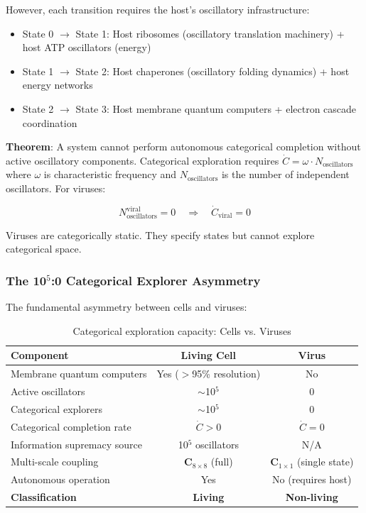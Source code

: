 \documentclass[11pt]{article}
\begin{document}
However, each transition requires the host's oscillatory infrastructure:

\begin{itemize}
\item State 0 $\to$ State 1: Host ribosomes (oscillatory translation machinery) + host ATP oscillators (energy)
\item State 1 $\to$ State 2: Host chaperones (oscillatory folding dynamics) + host energy networks
\item State 2 $\to$ State 3: Host membrane quantum computers + electron cascade coordination
\end{itemize}

\textbf{Theorem}: A system cannot perform autonomous categorical completion without active oscillatory components. Categorical exploration requires $\dot{C} = \omega \cdot N_{\text{oscillators}}$ where $\omega$ is characteristic frequency and $N_{\text{oscillators}}$ is the number of independent oscillators. For viruses:

\begin{equation}
N_{\text{oscillators}}^{\text{viral}} = 0 \quad \Rightarrow \quad \dot{C}_{\text{viral}} = 0
\end{equation}

Viruses are categorically static. They specify states but cannot explore categorical space.

\subsubsection{The 10$^5$:0 Categorical Explorer Asymmetry}

The fundamental asymmetry between cells and viruses:

\begin{table}[h]
\centering
\caption{Categorical exploration capacity: Cells vs. Viruses}
\label{tab:cell_virus_asymmetry}
\begin{tabular}{lcc}
\hline
\textbf{Component} & \textbf{Living Cell} & \textbf{Virus} \\
\hline
Membrane quantum computers & Yes ($>$95\% resolution) & No \\
Active oscillators & $\sim$10$^5$ & 0 \\
Categorical explorers & $\sim$10$^5$ & 0 \\
Categorical completion rate & $\dot{C} > 0$ & $\dot{C} = 0$ \\
Information supremacy source & 10$^5$ oscillators & N/A \\
Multi-scale coupling & $\mathbf{C}_{8 \times 8}$ (full) & $\mathbf{C}_{1 \times 1}$ (single state) \\
Autonomous operation & Yes & No (requires host) \\
\hline
\textbf{Classification} & \textbf{Living} & \textbf{Non-living} \\
\hline
\end{tabular}
\end{table}
\end{document}
